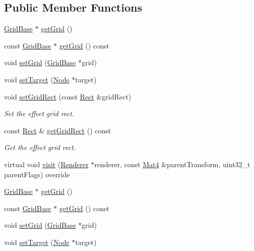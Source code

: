 \subsection*{Public Member Functions}
\begin{DoxyCompactItemize}
\item 
\hyperlink{classGridBase}{Grid\+Base} $\ast$ \hyperlink{classNodeGrid_a44d54b145cd25f9a61da77e607ab3baa}{get\+Grid} ()
\item 
const \hyperlink{classGridBase}{Grid\+Base} $\ast$ \hyperlink{classNodeGrid_aade5c184216fac8f3651bb0b84bbab17}{get\+Grid} () const
\item 
void \hyperlink{classNodeGrid_ac30e6f445f2a72e44ff7afeef2afb0ef}{set\+Grid} (\hyperlink{classGridBase}{Grid\+Base} $\ast$grid)
\item 
void \hyperlink{classNodeGrid_a1a54c6570d25c30a53e8c9291ddbc538}{set\+Target} (\hyperlink{classNode}{Node} $\ast$target)
\item 
void \hyperlink{classNodeGrid_adf29e6e9db43eaf8fd6156795e6e4286}{set\+Grid\+Rect} (const \hyperlink{classRect}{Rect} \&grid\+Rect)
\begin{DoxyCompactList}\small\item\em Set the effect grid rect. \end{DoxyCompactList}\item 
const \hyperlink{classRect}{Rect} \& \hyperlink{classNodeGrid_a8116f72215e420c5d075a590a53d24a3}{get\+Grid\+Rect} () const
\begin{DoxyCompactList}\small\item\em Get the effect grid rect. \end{DoxyCompactList}\item 
virtual void \hyperlink{classNodeGrid_afb46783d7e7fdaf8e3d58c0dde9ebd21}{visit} (\hyperlink{classRenderer}{Renderer} $\ast$renderer, const \hyperlink{classMat4}{Mat4} \&parent\+Transform, uint32\+\_\+t parent\+Flags) override
\item 
\hyperlink{classGridBase}{Grid\+Base} $\ast$ \hyperlink{classNodeGrid_a44d54b145cd25f9a61da77e607ab3baa}{get\+Grid} ()
\item 
const \hyperlink{classGridBase}{Grid\+Base} $\ast$ \hyperlink{classNodeGrid_aade5c184216fac8f3651bb0b84bbab17}{get\+Grid} () const
\item 
void \hyperlink{classNodeGrid_ac30e6f445f2a72e44ff7afeef2afb0ef}{set\+Grid} (\hyperlink{classGridBase}{Grid\+Base} $\ast$grid)
\item 
void \hyperlink{classNodeGrid_a1a54c6570d25c30a53e8c9291ddbc538}{set\+Target} (\hyperlink{classNode}{Node} $\ast$target)

\end{DoxyCompactItemize}
